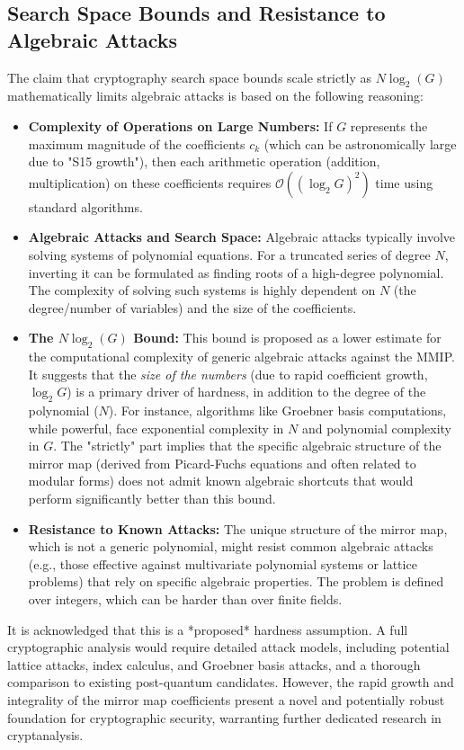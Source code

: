 \documentclass{book}
\theoremstyle{definition}
\begin{document}
\subsection{Search Space Bounds and Resistance to Algebraic Attacks}
The claim that cryptography search space bounds scale strictly as $N \log_2(G)$ mathematically limits algebraic attacks is based on the following reasoning:
\begin{itemize}
    \item \textbf{Complexity of Operations on Large Numbers:} If $G$ represents the maximum magnitude of the coefficients $c_k$ (which can be astronomically large due to "S15 growth"), then each arithmetic operation (addition, multiplication) on these coefficients requires $\mathcal{O}((\log_2 G)^2)$ time using standard algorithms.
    \item \textbf{Algebraic Attacks and Search Space:} Algebraic attacks typically involve solving systems of polynomial equations. For a truncated series of degree $N$, inverting it can be formulated as finding roots of a high-degree polynomial. The complexity of solving such systems is highly dependent on $N$ (the degree/number of variables) and the size of the coefficients.
    \item \textbf{The $N \log_2(G)$ Bound:} This bound is proposed as a lower estimate for the computational complexity of generic algebraic attacks against the MMIP. It suggests that the \textit{size of the numbers} (due to rapid coefficient growth, $\log_2 G$) is a primary driver of hardness, in addition to the degree of the polynomial ($N$). For instance, algorithms like Groebner basis computations, while powerful, face exponential complexity in $N$ and polynomial complexity in $G$. The "strictly" part implies that the specific algebraic structure of the mirror map (derived from Picard-Fuchs equations and often related to modular forms) does not admit known algebraic shortcuts that would perform significantly better than this bound.
    \item \textbf{Resistance to Known Attacks:} The unique structure of the mirror map, which is not a generic polynomial, might resist common algebraic attacks (e.g., those effective against multivariate polynomial systems or lattice problems) that rely on specific algebraic properties. The problem is defined over integers, which can be harder than over finite fields.
\end{itemize}
It is acknowledged that this is a *proposed* hardness assumption. A full cryptographic analysis would require detailed attack models, including potential lattice attacks, index calculus, and Groebner basis attacks, and a thorough comparison to existing post-quantum candidates. However, the rapid growth and integrality of the mirror map coefficients present a novel and potentially robust foundation for cryptographic security, warranting further dedicated research in cryptanalysis.
\end{document}
